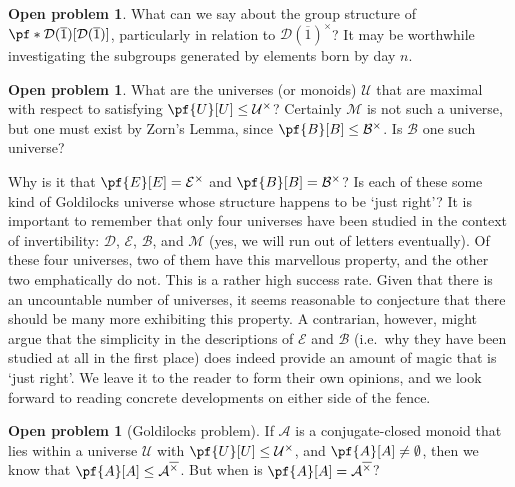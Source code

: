 \documentclass[11pt]{article}
\theoremstyle{definition}
\newtheorem{problem}[theorem]{Open problem}
\newcommand{\set}[1]{\mathcal{#1}}
\begin{document}
\begin{problem}
    What can we say about the group structure of
    $\pf*{\set{D}(\overline{1})}[\set{D}(\overline{1})]$, particularly in
    relation to $\set{D}(\overline{1})^\times$? It may be worthwhile
    investigating the subgroups generated by elements born by day $n$.
\end{problem}

\begin{problem}
    What are the universes (or monoids) $\set{U}$ that are maximal with respect
    to satisfying $\pf{U}[U]\leq\set{U}^\times$? Certainly $\set{M}$ is not
    such a universe, but one must exist by Zorn's Lemma, since
    $\pf{B}[B]\leq\set{B}^\times$. Is $\set{B}$ one such universe?
\end{problem}

Why is it that $\pf{E}[E]=\set{E}^\times$ and $\pf{B}[B]=\set{B}^\times$? Is
each of these some kind of Goldilocks universe whose structure happens to be
`just right'? It is important to remember that only four universes have been
studied in the context of invertibility: $\set{D}$, $\set{E}$, $\set{B}$, and
$\set{M}$ (yes, we will run out of letters eventually). Of these four
universes, two of them have this marvellous property, and the other two
emphatically do not. This is a rather high success rate. Given that there is an
uncountable number of universes, it seems reasonable to conjecture that there
should be many more exhibiting this property. A contrarian, however, might
argue that the simplicity in the descriptions of $\set{E}$ and $\set{B}$ (i.e.\
why they have been studied at all in the first place) does indeed provide an
amount of magic that is `just right'. We leave it to the reader to form their
own opinions, and we look forward to reading concrete developments on either
side of the fence.

\begin{problem}[Goldilocks problem]
    If $\set{A}$ is a conjugate-closed monoid that lies within a universe
    $\set{U}$ with $\pf{U}[U]\leq\set{U}^\times$, and $\pf{A}[A]\neq\emptyset$,
    then we know that $\pf{A}[A]\leq\set{A}^{\overline{\times}}$. But when is
    $\pf{A}[A]=\set{A}^{\overline{\times}}$?
\end{problem}
\end{document}
